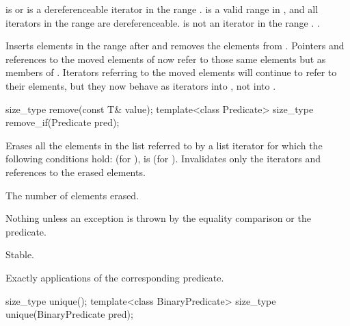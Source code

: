 \begin{itemdescr}
\pnum
\requires {} is  or is a
dereferenceable iterator in the range .  is a
valid range in , and all iterators in the range  are
dereferenceable.  is not an iterator in the range .
.

\pnum
\effects Inserts elements in the range  after  and
removes the elements from . Pointers and references to the moved elements of
 now refer to those same elements but as members of . Iterators
referring to the moved elements will continue to refer to their elements, but they now
behave as iterators into , not into .

\pnum
\complexity {}
\end{itemdescr}

%
%
\begin{itemdecl}
size_type remove(const T& value);
template<class Predicate> size_type remove_if(Predicate pred);
\end{itemdecl}

\begin{itemdescr}
\pnum
\effects Erases all the elements in the list referred to by a list iterator  for
which the following conditions hold:  (for ),
 is  (for ).
Invalidates only the iterators and references to the erased elements.

\pnum
\returns The number of elements erased.

\pnum
\throws Nothing unless an exception is thrown by the equality comparison or the
predicate.

\pnum
\remarks Stable.

\pnum
\complexity Exactly  applications of the corresponding
predicate.
\end{itemdescr}

%
\begin{itemdecl}
size_type unique();
template<class BinaryPredicate> size_type unique(BinaryPredicate pred);
\end{itemdecl}

